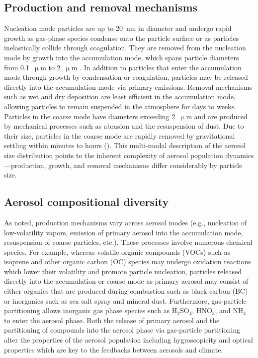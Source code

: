 \subsection{Production and removal mechanisms}
Nucleation mode particles are up to 20~nm in diameter and undergo rapid growth as gas-phase species condense onto the particle surface or as particles inelastically collide through coagulation. They are removed from the nucleation mode by growth into the accumulation mode, which spans particle diameters from 0.1~$\upmu$m to 2~$\upmu$m . In addition to particles that enter the accumulation mode through growth by condensation or coagulation, particles may be released directly into the accumulation mode via primary emissions. Removal mechanisms such as wet and dry deposition are least efficient in the accumulation mode, allowing particles to remain suspended in the atmosphere for days to weeks. Particles in the coarse mode have diameters exceeding 2~$\upmu$m  and are produced by mechanical processes such as abrasion and the resuspension of dust. Due to their size, particles in the coarse mode are rapidly removed by gravitational settling within minutes to hours (\cite{seinfeld_atmospheric_1998}). This multi-modal description of the aerosol size distribution points to the inherent complexity of aerosol population dynamics---production, growth, and removal mechanisms differ considerably by particle size. 

\subsection{Aerosol compositional diversity}
As noted, production mechanisms vary across aerosol modes (e.g., nucleation of low-volatility vapors, emission of primary aerosol into the accumulation mode, resuspension of coarse particles, etc.). These processes involve numerous chemical species. For example, whereas volatile organic compounds (VOCs) such as isoprene and other organic carbon (OC) species may undergo oxidation reactions which lower their volatility and promote particle nucleation, particles released directly into the accumulation or coarse mode as primary aerosol may consist of either organics that are produced during combustion such as black carbon (BC) or inorganics such as sea salt spray and mineral dust. Furthermore, gas-particle partitioning allows inorganic gas phase species such as H$_2$SO$_4$, HNO$_3$, and NH$_3$ to enter the aerosol phase. Both the release of primary aerosol and the partitioning of compounds into the aerosol phase via gas-particle partitioning alter the properties of the aerosol population including hygroscopicity and optical properties which are key to the feedbacks between aerosols and climate.  

